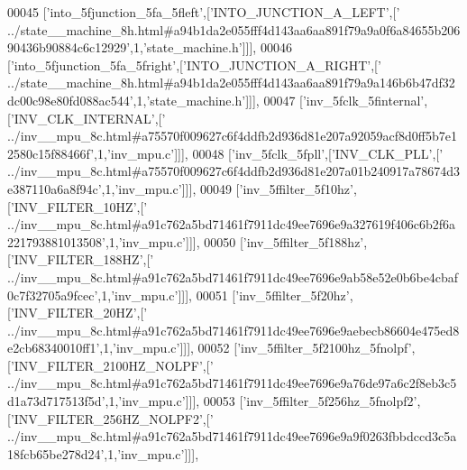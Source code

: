 \begin{DoxyCode}
00045   [\textcolor{stringliteral}{'into\_5fjunction\_5fa\_5fleft'},[\textcolor{stringliteral}{'INTO\_JUNCTION\_A\_LEFT'},[\textcolor{stringliteral}{'
      ../state\_\_machine\_8h.html#a94b1da2e055fff4d143aa6aa891f79a9a0f6a84655b20690436b90884c6c12929'},1,\textcolor{stringliteral}{'state\_machine.h'}]]],
00046   [\textcolor{stringliteral}{'into\_5fjunction\_5fa\_5fright'},[\textcolor{stringliteral}{'INTO\_JUNCTION\_A\_RIGHT'},[\textcolor{stringliteral}{'
      ../state\_\_machine\_8h.html#a94b1da2e055fff4d143aa6aa891f79a9a146b6b47df32dc00c98e80fd088ac544'},1,\textcolor{stringliteral}{'state\_machine.h'}]]],
00047   [\textcolor{stringliteral}{'inv\_5fclk\_5finternal'},[\textcolor{stringliteral}{'INV\_CLK\_INTERNAL'},[\textcolor{stringliteral}{'
      ../inv\_\_mpu\_8c.html#a75570f009627c6f4ddfb2d936d81e207a92059acf8d0ff5b7e12580c15f88466f'},1,\textcolor{stringliteral}{'inv\_mpu.c'}]]],
00048   [\textcolor{stringliteral}{'inv\_5fclk\_5fpll'},[\textcolor{stringliteral}{'INV\_CLK\_PLL'},[\textcolor{stringliteral}{'
      ../inv\_\_mpu\_8c.html#a75570f009627c6f4ddfb2d936d81e207a01b240917a78674d3e387110a6a8f94c'},1,\textcolor{stringliteral}{'inv\_mpu.c'}]]],
00049   [\textcolor{stringliteral}{'inv\_5ffilter\_5f10hz'},[\textcolor{stringliteral}{'INV\_FILTER\_10HZ'},[\textcolor{stringliteral}{'
      ../inv\_\_mpu\_8c.html#a91c762a5bd71461f7911dc49ee7696e9a327619f406c6b2f6a221793881013508'},1,\textcolor{stringliteral}{'inv\_mpu.c'}]]],
00050   [\textcolor{stringliteral}{'inv\_5ffilter\_5f188hz'},[\textcolor{stringliteral}{'INV\_FILTER\_188HZ'},[\textcolor{stringliteral}{'
      ../inv\_\_mpu\_8c.html#a91c762a5bd71461f7911dc49ee7696e9ab58e52e0b6be4cbaf0c7f32705a9fcec'},1,\textcolor{stringliteral}{'inv\_mpu.c'}]]],
00051   [\textcolor{stringliteral}{'inv\_5ffilter\_5f20hz'},[\textcolor{stringliteral}{'INV\_FILTER\_20HZ'},[\textcolor{stringliteral}{'
      ../inv\_\_mpu\_8c.html#a91c762a5bd71461f7911dc49ee7696e9aebecb86604e475ed8e2cb68340010ff1'},1,\textcolor{stringliteral}{'inv\_mpu.c'}]]],
00052   [\textcolor{stringliteral}{'inv\_5ffilter\_5f2100hz\_5fnolpf'},[\textcolor{stringliteral}{'INV\_FILTER\_2100HZ\_NOLPF'},[\textcolor{stringliteral}{'
      ../inv\_\_mpu\_8c.html#a91c762a5bd71461f7911dc49ee7696e9a76de97a6c2f8eb3c5d1a73d717513f5d'},1,\textcolor{stringliteral}{'inv\_mpu.c'}]]],
00053   [\textcolor{stringliteral}{'inv\_5ffilter\_5f256hz\_5fnolpf2'},[\textcolor{stringliteral}{'INV\_FILTER\_256HZ\_NOLPF2'},[\textcolor{stringliteral}{'
      ../inv\_\_mpu\_8c.html#a91c762a5bd71461f7911dc49ee7696e9a9f0263fbbdccd3c5a18fcb65be278d24'},1,\textcolor{stringliteral}{'inv\_mpu.c'}]]],

\end{DoxyCode}
